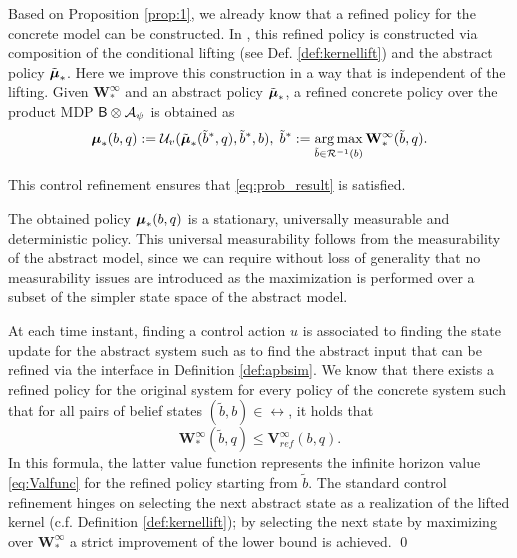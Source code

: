 \documentclass{ifacconf}
\begin{document}
Based on Proposition \ref{prop:1}, we already know that a refined policy for the concrete model can be constructed. In \cite{haesaert2017verification}, this refined policy is constructed via composition of the conditional lifting %
 (see Def. \ref{def:kernellift}) and the abstract policy $\tilde  {{\boldsymbol{\mu}}}_\ast$. Here we improve this construction in a way that is independent of the lifting. Given $\mathbf{W}^\infty_\ast$ and an abstract policy $\tilde {{\boldsymbol{\mu}}}_\ast$, a refined concrete policy over the product MDP $\mathsf{B}\otimes\mathcal{A}_\psi$ is obtained as
\begin{equation*}
		{\boldsymbol{\mu}}_\ast(b,q): = \mathcal{U}_{v}( \tilde{{\boldsymbol{\mu}}}_\ast(\tilde b^*, q), \tilde b^*, b), \; \tilde b^*:=\operatorname*{arg\,max}_{ \tilde b\in
		\mathcal{R}^{-1}(b)} \mathbf  W^\infty_\ast(\tilde b,q).
\end{equation*}
\begin{prop}
  This control refinement ensures that \eqref{eq:prob_result} is satisfied.
\end{prop}
The obtained policy $	{\boldsymbol{\mu}}_\ast(b,q)$ is a stationary, universally measurable and deterministic policy. This universal measurability follows from the measurability of the abstract model, since we can require without loss of generality that no measurability  issues are introduced as the maximization is performed over a subset of the simpler state space of the abstract model. 
\begin{pf}At each time instant, finding a control action $u$ is associated to finding the state update for the abstract system such as to find the abstract input that can be refined via the interface in Definition \ref{def:apbsim}.  
We know that there exists a refined policy for the original system for every policy of the concrete system such that 
for all pairs of belief states $(\tilde b,b)\in\rel$, it holds that 
\begin{equation}\label{eq:W:V}\mathbf  W^\infty_\ast(\tilde b,q)\leq \mathbf  V^\infty_{ref}( b,q).\end{equation} In this formula, the latter value function represents the infinite horizon value \eqref{eq:Valfunc} for the refined policy starting from $\tilde b$.   The standard control refinement hinges on selecting the next abstract state as a realization of the lifted kernel (c.f. Definition \ref{def:kernellift}); by selecting the next state by maximizing over $\mathbf  W^\infty_\ast$ a strict improvement of the lower bound is achieved. \qed
\end{pf}
\end{document}
